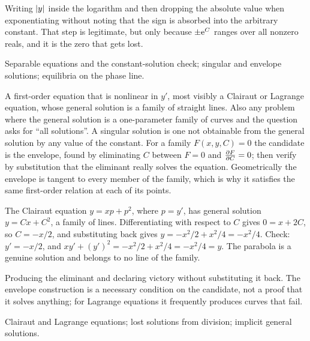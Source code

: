 \begin{trap}
Writing $\left\lvert y\right\rvert$ inside the logarithm and then dropping the absolute value when exponentiating without noting that the sign is absorbed into the arbitrary constant. That step is legitimate, but only because $\pm\mathrm{e}^{C}$ ranges over all nonzero reals, and it is the zero that gets lost.
\end{trap}

\begin{seealsob}Separable equations and the constant-solution check; singular and envelope solutions; equilibria on the phase line.\end{seealsob}

\cue A first-order equation that is nonlinear in $y'$, most visibly a Clairaut or Lagrange equation, whose general solution is a family of straight lines. Also any problem where the general solution is a one-parameter family of curves and the question asks for ``all solutions''.
\method A singular solution is one not obtainable from the general solution by any value of the constant. For a family $F(x,y,C)=0$ the candidate is the envelope, found by eliminating $C$ between $F=0$ and $\frac{\partial F}{\partial C}=0$; then verify by substitution that the eliminant really solves the equation. Geometrically the envelope is tangent to every member of the family, which is why it satisfies the same first-order relation at each of its points.

\begin{worked}
The Clairaut equation $y=xp+p^{2}$, where $p=y'$, has general solution $y=Cx+C^{2}$, a family of lines. Differentiating with respect to $C$ gives $0=x+2C$, so $C=-x/2$, and substituting back gives $y=-x^{2}/2+x^{2}/4=-x^{2}/4$. Check: $y'=-x/2$, and $xy'+(y')^{2}=-x^{2}/2+x^{2}/4=-x^{2}/4=y$. The parabola is a genuine solution and belongs to no line of the family.
\end{worked}

\begin{trap}
Producing the eliminant and declaring victory without substituting it back. The envelope construction is a necessary condition on the candidate, not a proof that it solves anything; for Lagrange equations it frequently produces curves that fail.
\end{trap}

\begin{seealsob}Clairaut and Lagrange equations; lost solutions from division; implicit general solutions.\end{seealsob}

